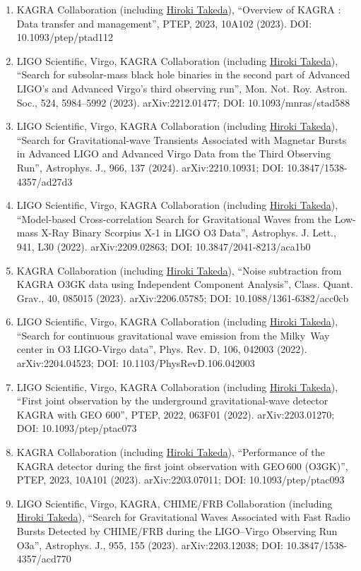 \documentclass[uplatex, 11pt]{jsarticle}
\begin{document}
\begin{enumerate}
\item KAGRA Collaboration (including \uline{Hiroki Takeda}), “Overview of KAGRA : Data transfer and management”, PTEP, 2023, 10A102 (2023). DOI: 10.1093/ptep/ptad112
\item LIGO Scientific, Virgo, KAGRA Collaboration (including \uline{Hiroki Takeda}), “Search for subsolar-mass black hole binaries in the second part of Advanced LIGO's and Advanced Virgo's third observing run”, Mon. Not. Roy. Astron. Soc., 524, 5984--5992 (2023). arXiv:2212.01477; DOI: 10.1093/mnras/stad588
\item LIGO Scientific, Virgo, KAGRA Collaboration (including \uline{Hiroki Takeda}), “Search for Gravitational-wave Transients Associated with Magnetar Bursts in Advanced LIGO and Advanced Virgo Data from the Third Observing Run”, Astrophys. J., 966, 137 (2024). arXiv:2210.10931; DOI: 10.3847/1538-4357/ad27d3
\item LIGO Scientific, Virgo, KAGRA Collaboration (including \uline{Hiroki Takeda}), “Model-based Cross-correlation Search for Gravitational Waves from the Low-mass X-Ray Binary Scorpius X-1 in LIGO O3 Data”, Astrophys. J. Lett., 941, L30 (2022). arXiv:2209.02863; DOI: 10.3847/2041-8213/aca1b0
\item KAGRA Collaboration (including \uline{Hiroki Takeda}), “Noise subtraction from KAGRA O3GK data using Independent Component Analysis”, Class. Quant. Grav., 40, 085015 (2023). arXiv:2206.05785; DOI: 10.1088/1361-6382/acc0cb
\item LIGO Scientific, Virgo, KAGRA Collaboration (including \uline{Hiroki Takeda}), “Search for continuous gravitational wave emission from the Milky~Way center in O3 LIGO-Virgo data”, Phys. Rev. D, 106, 042003 (2022). arXiv:2204.04523; DOI: 10.1103/PhysRevD.106.042003
\item LIGO Scientific, Virgo, KAGRA Collaboration (including \uline{Hiroki Takeda}), “First joint observation by the underground gravitational-wave detector KAGRA with GEO 600”, PTEP, 2022, 063F01 (2022). arXiv:2203.01270; DOI: 10.1093/ptep/ptac073
\item KAGRA Collaboration (including \uline{Hiroki Takeda}), “Performance of the KAGRA detector during the first joint observation with GEO\,600 (O3GK)”, PTEP, 2023, 10A101 (2023). arXiv:2203.07011; DOI: 10.1093/ptep/ptac093
\item LIGO Scientific, Virgo, KAGRA, CHIME/FRB Collaboration (including \uline{Hiroki Takeda}), “Search for Gravitational Waves Associated with Fast Radio Bursts Detected by CHIME/FRB during the LIGO–Virgo Observing Run O3a”, Astrophys. J., 955, 155 (2023). arXiv:2203.12038; DOI: 10.3847/1538-4357/acd770

\end{enumerate}
\end{document}

